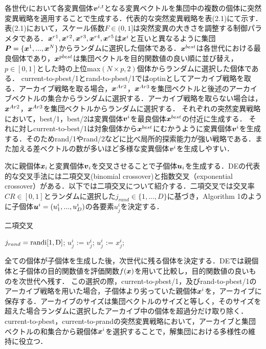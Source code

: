 \documentclass[a4paper,11pt,oneside,openany]{jsbook}
\def\vector#1{\mbox{\boldmath $#1$}}
\begin{document}
各世代$t$において各変異個体${\vector{v}^{i,t}}$となる変異ベクトルを集団中の複数の個体に突然変異戦略を適用することで生成する．代表的な突然変異戦略を表(2.1)にて示す．表(2.1)において，スケール係数${F\in(0,1]}$は突然変異の大きさを調整する制御パラメタである．$\vector{x}^{r1},\vector{x}^{r2},\vector{x}^{r3},\vector{x}^{r4},\vector{x}^{r5}$は${\vector{x}^i}$と互いと異なるように集団$\vector{P} = \{ \vector{x}^1, ..., \vector{x}^N \}$からランダムに選択した個体である．$\vector{x}^{best}$は各世代における最良個体であり，$\vector{x}^{pbest}$は集団ベクトルを目的関数値の良い順に並び替え，${p\in[0,1]}とした時の上位$max$(N \times p, 2)$個体からランダムに選択した個体である．
current-to-$p$best/1とrand-to-$p$best/1ではoptinとしてアーカイブ戦略を取る．アーカイブ戦略を取る場合，${\vector{x}^{Ar2}}$，${\vector{x}^{Ar3}}$を集団ベクトルと後述のアーカイブベクトルの集合からランダムに選択する．アーカイブ戦略を取らない場合は，${\vector{x}^{Ar2}}$，${\vector{x}^{Ar3}}$を集団ベクトルからランダムに選択する．
それぞれの突然変異戦略において，best/1，best/2は変異個体{$\vector{v}^i$}を最良個体$\vector{x}^{best}$の付近に生成する．
それに対しcurrent-to-best/1は対象個体から$\vector{x}^{best}$にむかうように変異個体{$\vector{v}^i$}を生成する．そのためrand/1やrand/2などに比べ局所的探索能力が強い戦略である．また加える差ベクトルの数が多いほど多様な変異個体{$\vector{v}^i$}を生成しやすい．

次に親個体$\vector{x}_i$と変異個体$\vector{v}_i$を交叉させることで子個体$\vector{u}_i$を生成する．DEの代表的な交叉手法には二項交叉(binomial crossover)と指数交叉（exponential crossover）がある．以下では二項交叉について紹介する．二項交叉では交叉率$CR \in [0,1]$とランダムに選択した$j_{rand} \in \{1,...,D\}$に基づき，Algorithm 1のように子個体$\vector{u}^i = (u^i_1,...,u^i_D)$の各要素$u^i_j$を決定する．


\begin{algorithm}
\caption{二項交叉}
\label{alg:pbnf}
\begin{algorithmic}
\STATE $j_{rand} = \rm{randi}[1, D]$;
  \IF {$\rm{rand}[0,1) \leqq $ \OR $j == j_{rand} $}
    \STATE $u^i_j$ := $v^i_j$;
  \ELSE
    \STATE $u^i_j$ := $x^i_j$;
  \ENDIF
\ENDFOR
\end{algorithmic}
\end{algorithm}


全ての個体が子個体を生成した後，次世代に残る個体を決定する．DEでは親個体と子個体の目的関数値を評価関数$f(\vector{x})$を用いて比較し，目的関数値の良いものを次世代へ残す．
この選択の際，current-to-$p$best/1，及びrand-to-$p$best/1のアーカイブ戦略を用いた場合，子個体より劣っていた親個体$\vector{x}^i$を，アーカイブに保存する．アーカイブのサイズは集団ベクトルのサイズと等しく，そのサイズを超えた場合ランダムに選択したアーカイブ中の個体を超過分だけ取り除く．current-to-$p$best，current-to-$p$randの突然変異戦略において，アーカイブと集団ベクトルの和集合から親個体$\vector{x}^i$を選択することで，解集団における多様性の維持に役立つ．
\end{document}
